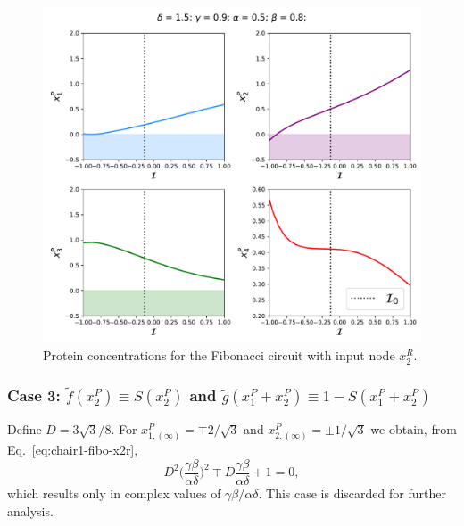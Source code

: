 \begin{figure}[H]
    \centering
    \includegraphics[scale=0.5]{figs/numerics/fibo_x2r_case2.pdf}
    \caption{Protein concentrations for the Fibonacci circuit with input node $x_2^R$.}
    \label{fig:case2-fibo-chair}
\end{figure}

\subsubsection{Case 3: $\tilde{f}(x_2^P) \equiv S(x_2^P)$ and $\tilde{g}(x_1^P + x_2^P) \equiv 1 - S(x_1^P + x_2^P)$}

Define $D = 3\sqrt{3}/8$. For $x_{1,(\infty)}^P = \mp 2/\sqrt{3}$ and $x_{2,(\infty)}^P = \pm 1/\sqrt{3}$ we obtain, 
from Eq.~\ref{eq:chair1-fibo-x2r},  
\begin{equation}
    D^2\bigg(\frac{\gamma\beta}{\alpha\delta}\bigg)^2 \mp D\frac{\gamma\beta}{\alpha\delta} + 1 = 0,
\end{equation}
which results only in complex values of $\gamma\beta/\alpha\delta$. This case is discarded for further analysis.

